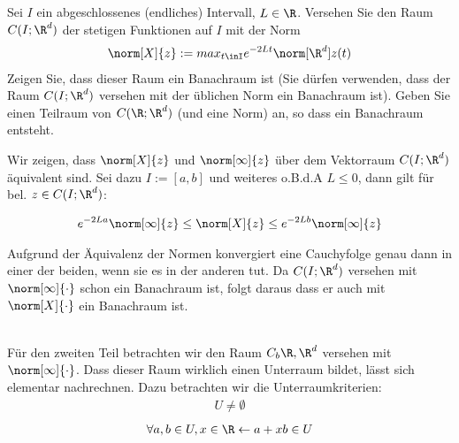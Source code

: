 \begin{exercise}
  Sei $I$ ein abgeschlossenes (endliches) Intervall, $L \in \R$.
  Versehen Sie den Raum $C(I;\R^{d})$ der stetigen Funktionen auf $I$ mit der Norm
  \begin{align*}
    \norm[X]{z} := max_{t\inI}e^{-2Lt}\norm[\R^{d}]{z(t)}
  \end{align*}
  Zeigen Sie, dass dieser Raum ein Banachraum ist (Sie dürfen verwenden, dass der Raum
  $C(I;\R^{d})$ versehen mit der üblichen Norm ein Banachraum ist). Geben Sie einen Teilraum
  von $C(\R;\R^{d})$ (und eine Norm) an, so dass ein Banachraum entsteht.
\end{exercise}

\begin{solution}
  Wir zeigen, dass $\norm[X]{z}$ und $\norm[\infty]{z}$ über dem Vektorraum $C(I;\R^{d})$
  äquivalent sind. Sei dazu $I:=[a,b]$ und weiteres o.B.d.A $L \leq 0$, dann gilt für bel.
  $z \in C(I;\R^{d})$:

  \begin{align*}
    e^{-2La}\norm[\infty]{z}
    \leq
    \norm[X]{z}
    \leq
    e^{-2Lb}\norm[\infty]{z}
  \end{align*}

  Aufgrund der Äquivalenz der Normen konvergiert eine Cauchyfolge genau dann in einer der beiden,
  wenn sie es in der anderen tut. Da $C(I;\R^{d})$ versehen mit $\norm[\infty]{\cdot}$ schon ein Banachraum ist,
  folgt daraus dass er auch mit $\norm[X]{\cdot}$ ein Banachraum ist.

  \\

  Für den zweiten Teil betrachten wir den Raum $C_{b}{\R,\R^{d}}$ versehen mit $\norm[\infty]{\cdot}$.
  Dass dieser Raum wirklich einen Unterraum bildet, lässt sich elementar nachrechnen.
  Dazu betrachten wir die Unterraumkriterien:
  \begin{align*}
    U \neq \emptyset
  \end{align*}
  \begin{align*}
    \forall a,b \in U, x \in \R \leftarrow a+xb \in U
  \end{align*}


\end{solution}
